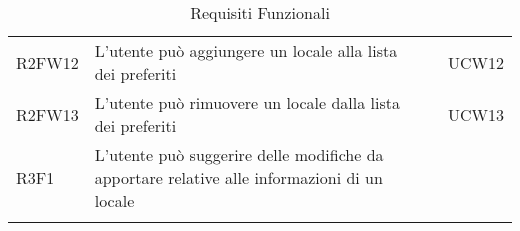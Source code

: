 \begin{longtable}{ m{}<{\centering}  m{}<{\centering}  m{}<{\centering}  m{}<{\centering}}
	R2FW12 & L’utente può aggiungere un locale alla lista dei preferiti & \De &  UCW12\\

	R2FW13 & L’utente può rimuovere un locale dalla lista dei preferiti & \De & UCW13\\

	R3F1 & L’utente può suggerire delle modifiche da apportare relative alle informazioni di un locale & \Fa & \Di \\

	\hiderowcolors \caption{Requisiti Funzionali}
\end{longtable}

\clearpage